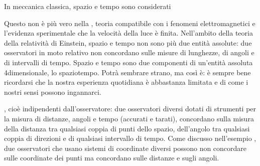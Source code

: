 \documentclass[letterpaper,10pt,italian]{jupyterBook}
\begin{document}
\sphinxAtStartPar
In meccanica classica, spazio e tempo sono considerati %
\begin{footnote}[1]\sphinxAtStartFootnote
Questo non è più vero nella , teoria compatibile con i fenomeni elettromagnetici e l’evidenza sperimentale che la velocità della luce è finita. Nell’ambito della teoria della relatività di Einstein, spazio e tempo non sono più due entità assolute: due osservatori in moto relativo non concordano sulle misure di lunghezze, di angoli e di intervalli di tempo. Spazio e tempo sono due componenti di un’entità assoluta 4\sphinxhyphen{}dimensionale, lo spazio\sphinxhyphen{}tempo. Potrà sembrare strano, ma così è: è sempre bene ricordarsi che la nostra esperienza quotidiana è abbastanza limitata e di come i nostri sensi possono ingannarci.
%
\end{footnote}, cioè indipendenti dall’osservatore: due osservatori diversi dotati di strumenti per la misura di distanze, angoli e tempo (accurati e tarati), concordano sulla misura della distanza tra qualsiasi coppia di punti dello spazio, dell’angolo tra qualsiasi coppia di direzioni e di qualsiasi intervallo di tempo. Come discusso nell’esempio {\hyperref[\detokenize{ch/mechanics/kinematics:invariance-space-and-time}]{}}, due osservatori che usano sistemi di coordinate diversi possono non concordare sulle coordinate dei punti ma concordano sulle distanze e sugli angoli.
\end{document}
